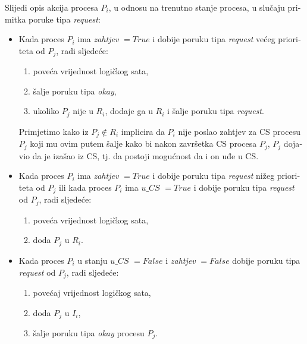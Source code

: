 \documentclass[12pt]{rectors}
\begin{document}
\begin{otherlanguage}{croatian}
Slijedi opis akcija procesa $P_i$, u odnosu na trenutno stanje procesa, u slučaju primitka poruke tipa \textit{request}:%
\begin{itemize}
	\item 
Kada proces $P_i$ ima \textit{zahtjev} $= True$ i dobije poruku tipa \textit{request} većeg prioriteta od $P_j$, radi sljedeće:
\begin{enumerate}
	\item poveća vrijednost logičkog sata,
	\item šalje poruku tipa \textit{okay},
	\item ukoliko $P_j$ nije u $R_i$, dodaje ga u $R_i$ i šalje poruku tipa \textit{request}.
\end{enumerate}
Primjetimo kako iz $P_j \not \in R_i$ implicira da $P_i$ nije poslao zahtjev za CS procesu
$P_j$ koji mu ovim putem šalje kako bi nakon završetka CS procesa $P_j$, $P_j$ dojavio
da je izašao iz CS, tj. da postoji mogućnost da i on uđe u CS.

\item
Kada proces $P_i$ ima \textit{zahtjev} $= True$ i dobije poruku tipa \textit{request} nižeg prioriteta od $P_j$ ili kada proces $P_i$ ima \textit{$u\_CS$} $= True$ i dobije poruku tipa \textit{request} od $P_j$, radi sljedeće:
\begin{enumerate}
	\item poveća vrijednost logičkog sata,
	\item doda $P_j$ u $R_i$.
\end{enumerate}

\item
Kada proces $P_i$ u stanju \textit{$u\_CS$} $= False$ i \textit{zahtjev} $= False$ dobije poruku tipa \textit{request} od $P_j$, radi sljedeće:
\begin{enumerate}
	\item povećaj vrijednost logičkog sata,
	\item doda $P_j$ u $I_i$,
	\item šalje poruku tipa \textit{okay} procesu $P_j$.
\end{enumerate}

\end{itemize}


\end{otherlanguage}
\end{document}

